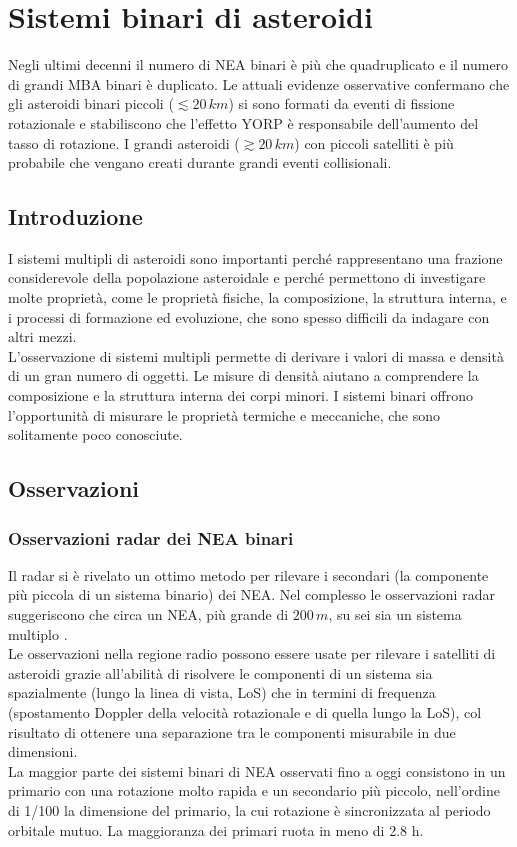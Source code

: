 \documentclass[a4paper,11pt,openright]{book}
\begin{document}
\section{Sistemi binari di asteroidi}\label{sec:binary_system}
Negli ultimi decenni il numero di NEA binari è più che quadruplicato e il numero di grandi MBA binari è duplicato. Le attuali evidenze osservative confermano che gli asteroidi binari piccoli ($\lesssim 20\,km$) si sono formati da eventi di fissione rotazionale e stabiliscono che l'effetto YORP è responsabile dell'aumento del tasso di rotazione. I grandi asteroidi ($\gtrsim20\,km$) con piccoli satelliti è più probabile che vengano creati durante grandi eventi collisionali.

\subsection{Introduzione}
I sistemi multipli di asteroidi sono importanti perché rappresentano una frazione considerevole della popolazione asteroidale e perché permettono di investigare molte proprietà, come le proprietà fisiche, la composizione, la struttura interna, e i processi di formazione ed evoluzione, che sono spesso difficili da indagare con altri mezzi.\\
L'osservazione di sistemi multipli permette di derivare i valori di massa e densità di un gran numero di oggetti. Le misure di densità aiutano a comprendere la composizione e la struttura interna dei corpi minori. I sistemi binari offrono l'opportunità di misurare le proprietà termiche e meccaniche, che sono solitamente poco conosciute.

\subsection{Osservazioni}
\subsubsection{Osservazioni radar dei NEA binari}
Il radar si è rivelato un ottimo metodo per rilevare i secondari (la componente più piccola di un sistema binario) dei NEA. Nel complesso le osservazioni radar suggeriscono che circa un NEA, più grande di $200\,m$, su sei sia un sistema multiplo \citep{taylor_shape_2012}.\\
Le osservazioni nella regione radio possono essere usate per rilevare i satelliti di asteroidi grazie all'abilità di risolvere le componenti di un sistema sia spazialmente (lungo la linea di vista, LoS) che in termini di frequenza (spostamento Doppler della velocità rotazionale e di quella lungo la LoS), col risultato di ottenere una separazione tra le componenti misurabile in due dimensioni.\\
La maggior parte dei sistemi binari di NEA osservati fino a oggi consistono in un primario con una rotazione molto rapida e un secondario più piccolo, nell'ordine di 1/100 la dimensione del primario, la cui rotazione è sincronizzata al periodo orbitale mutuo. La maggioranza dei primari ruota in meno di 2.8 h.
\end{document}
